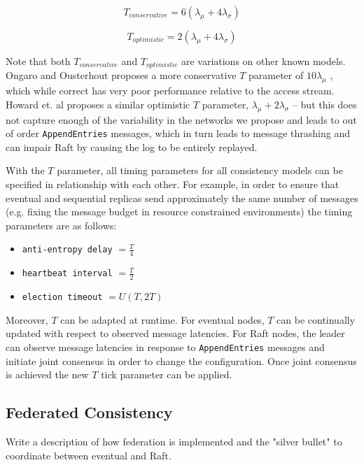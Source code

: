 \documentclass[10pt,conference,compsocconf,letterpaper]{IEEEtran}
\begin{document}
\begin{equation}
    T_{conservative} = 6(\lambda_{\mu} + 4\lambda_{\sigma})
\end{equation}

\begin{equation}
    T_{optimistic} = 2(\lambda_{\mu} + 4\lambda_{\sigma})
\end{equation}

Note that both $T_{conservative}$ and $T_{optimistic}$ are variations on other known models. Ongaro and Ousterhout proposes a more conservative $T$ parameter of $10\lambda_{\mu}$ \cite{ongaro_search_2014}, which while correct has very poor performance relative to the access stream. Howard et. al proposes a similar optimistic $T$ parameter, $\lambda_{\mu} + 2\lambda_{\sigma}$ \cite{howard_raft_2015} -- but this does not capture enough of the variability in the networks we propose and leads to out of order \texttt{AppendEntries} messages, which in turn leads to message thrashing and can impair Raft by causing the log to be entirely replayed.

With the $T$ parameter, all timing parameters for all consistency models can be specified in relationship with each other. For example, in order to ensure that eventual and sequential replicas send approximately the same number of messages (e.g. fixing the message budget in resource constrained environments) the timing parameters are as follows:

\begin{itemize}
    \item \texttt{anti-entropy delay} $= \frac{T}{4}$
    \item \texttt{heartbeat interval} $= \frac{T}{2}$
    \item \texttt{election timeout} $= U(T, 2T)$
\end{itemize}

Moreover, $T$ can be adapted at runtime. For eventual nodes, $T$ can be continually updated with respect to observed message latencies. For Raft nodes, the leader can observe message latencies in response to \texttt{AppendEntries} messages and initiate joint consensus in order to change the configuration. Once joint consensus is achieved the new $T$ tick parameter can be applied.

\subsection{Federated Consistency}

Write a description of how federation is implemented and the "silver bullet" to coordinate between eventual and Raft.
\end{document}
